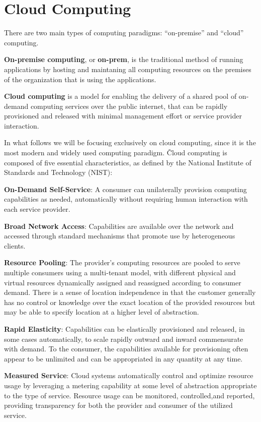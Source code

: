 \section{Cloud Computing}

There are two main types of computing paradigms: ``on-premise'' and ``cloud'' computing.

\textbf{On-premise computing}, or \textbf{on-prem}, is the traditional method of running applications by hosting and
maintaning all computing resources on the premises of the organization that is using the applications.
\ed

\label{def:cloud_computing}
\textbf{Cloud computing} is a model for enabling the delivery of a shared pool of on-demand computing services over
the public internet, that can be rapidly provisioned and released with minimal management effort or service provider
interaction.
\ed

In what follows we will be focusing exclusively on cloud computing, since it is the most modern and widely used
computing paradigm. \v

Cloud computing is composed of five essential characteristics, as defined by the National Institute of Standards and
Technology (NIST):
\bit
\item \textbf{On-Demand Self-Service}: A consumer can unilaterally provision computing capabilities as needed,
automatically without requiring human interaction with each service provider.
\item \textbf{Broad Network Access}: Capabilities are available over the network and accessed through standard
mechanisms that promote use by heterogeneous clients.
\item \textbf{Resource Pooling}: The provider's computing resources are pooled to serve multiple consumers using a
multi-tenant model, with different physical and virtual resources dynamically assigned and reassigned according to
consumer demand. There is a sense of location independence in that the customer generally has no control or knowledge
over the exact location of the provided resources but may be able to specify location at a higher level of abstraction.
\item \textbf{Rapid Elasticity}: Capabilities can be elastically provisioned and released, in some cases automatically,
to scale rapidly outward and inward commensurate with demand. To the consumer, the capabilities available for
provisioning often appear to be unlimited and can be appropriated in any quantity at any time.
\item \textbf{Measured Service}: Cloud systems automatically control and optimize resource usage by leveraging a
metering capability at some level of abstraction appropriate to the type of service. Resource usage can be monitored,
controlled,and reported, providing transparency for both the provider and consumer of the utilized service.
\eit

